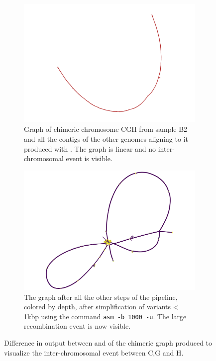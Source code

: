 \begin{figure}[h!]
	\centering
	\begin{subfigure}[b]{\textwidth}
		\centering
		\includegraphics[width=.8\linewidth]{figures/lodelo/minigraph_cgh.png}
		\caption{Graph of chimeric chromosome CGH from sample B2 and all the contigs of the other genomes aligning to it produced with \minigraph. The graph is linear and no inter-chromosomal event is visible.}
		\label{fig:cgh_mingraph}
	\end{subfigure}%

	\begin{subfigure}[b]{\textwidth}
		\centering
		\includegraphics[width=.8\linewidth]{figures/lodelo/mcactus_cgh_u1000_by_depth.png}
		\caption{The graph after all the other steps of the \mcactus pipeline, colored by depth, after simplification of variants < 1kbp using the command \gfatools  \texttt{asm -b 1000 -u}. The large recombination event is now visible.}
		\label{fig:cgh_mcactus}
	\end{subfigure}
	\caption[Difference in output between \minigraph and \mcactus.]{Difference in output between \minigraph and \mcactus of the chimeric graph produced to visualize the inter-chromosomal event between C,G and H.}
	\label{fig:chromosome_cgh_minigraph}
\end{figure}

